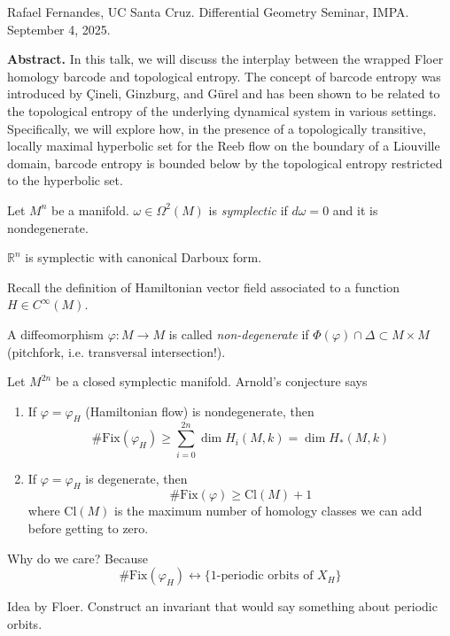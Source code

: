 \noindent
Rafael Fernandes, UC Santa Cruz.
Differential Geometry Seminar, IMPA.
September 4, 2025.

\medskip\noindent
{\bf Abstract.} In this talk, we will discuss
the interplay between the
wrapped Floer homology barcode and
topological entropy. The concept of barcode
entropy was introduced by Çineli, Ginzburg,
and Gürel and has been shown to be
related to the topological entropy of the
underlying dynamical system in various
settings. Specifically, we will explore how,
in the presence of a topologically
transitive, locally maximal hyperbolic set
for the Reeb flow on the boundary of
a Liouville domain, barcode entropy is
bounded below by the topological entropy
restricted to the hyperbolic set.

\medskip\noindent

Let $M^n$ be a manifold.
$\omega \in \Omega^2(M)$ is {\it symplectic}
if $d \omega=0$ and it is
nondegenerate.

\begin{example}
\label{example-Rn-is-symplectic}
$\mathbb{R}^n$ is symplectic with canonical
Darboux form.
\end{example}

Recall the definition of Hamiltonian vector
field
associated to a function $H \in C^\infty(M)$.

\begin{definition}
\label{definition-nonde-diffe}
A diffeomorphism $\varphi:M \to M$ is called
{\it non-degenerate} if
$\Phi(\varphi)\cap\Delta \subset M\times M$
(pitchfork, i.e. transversal intersection!).
\end{definition}

Let $M^{2n}$ be a closed symplectic manifold.
Arnold's conjecture says
\begin{enumerate}
\item If $\varphi=\varphi_H$ (Hamiltonian
flow) is nondegenerate, then
$$
\# \text{Fix}(\varphi_H) \geq
\sum_{i=0}^{2n}\dim H_i(M,k)=\dim H_*(M,k)
$$
\item If $\varphi=\varphi_H$ is degenerate,
then
$$
\# \text{Fix}(\varphi)\geq \text{Cl}(M)+1
$$
where $\text{Cl}(M)$ is the maximum number of
homology classes
we can add before getting to zero.
\end{enumerate}

Why do we care? Because
$$
\#
\text{Fix}(\varphi_H)
\leftrightarrow\{\text{1-periodic
orbits of $X_H$}\}
$$

Idea by Floer. Construct an invariant that
would
say something about periodic orbits.

